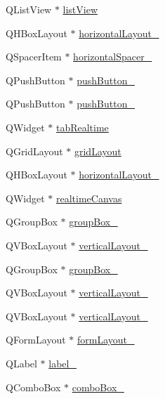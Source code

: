 \begin{DoxyCompactItemize}
\item 
Q\+List\+View $\ast$ \hyperlink{class_ui___client_view_ab642793b2516ba6e58ebbe2d7fe42fa5}{list\+View}
\item 
Q\+H\+Box\+Layout $\ast$ \hyperlink{class_ui___client_view_aed82dc8f9f66b2148ec2d902cb69feb1}{horizontal\+Layout\+\_}
\item 
Q\+Spacer\+Item $\ast$ \hyperlink{class_ui___client_view_acb80a03d3795c11de4c7da9cdcbc0872}{horizontal\+Spacer\+\_}
\item 
Q\+Push\+Button $\ast$ \hyperlink{class_ui___client_view_a343d0ec185fc44de1d6da83f943cb90f}{push\+Button\+\_}
\item 
Q\+Push\+Button $\ast$ \hyperlink{class_ui___client_view_af081e4b32fc67ba9c0244bea3c47fc00}{push\+Button\+\_}
\item 
Q\+Widget $\ast$ \hyperlink{class_ui___client_view_ab7a905c8d7da66d465f7801c6724a591}{tab\+Realtime}
\item 
Q\+Grid\+Layout $\ast$ \hyperlink{class_ui___client_view_ab9f0b12942ece16be12503604c116b74}{grid\+Layout}
\item 
Q\+H\+Box\+Layout $\ast$ \hyperlink{class_ui___client_view_a86c70e5ff3d118a228d6010bfaa302d6}{horizontal\+Layout\+\_}
\item 
Q\+Widget $\ast$ \hyperlink{class_ui___client_view_a37773ebe17a2e74feea99cb4c45be113}{realtime\+Canvas}
\item 
Q\+Group\+Box $\ast$ \hyperlink{class_ui___client_view_a216081f1bbb11729d0ecff74ecb3e705}{group\+Box\+\_}
\item 
Q\+V\+Box\+Layout $\ast$ \hyperlink{class_ui___client_view_ad1037c40aae069d817bda2d6b37e7cd8}{vertical\+Layout\+\_}
\item 
Q\+Group\+Box $\ast$ \hyperlink{class_ui___client_view_a62a75df620b063d5bd67f65a201f5657}{group\+Box\+\_}
\item 
Q\+V\+Box\+Layout $\ast$ \hyperlink{class_ui___client_view_a65f193067cb20dcfde40c2fa94d50bc9}{vertical\+Layout\+\_}
\item 
Q\+V\+Box\+Layout $\ast$ \hyperlink{class_ui___client_view_ad5ce2749c87f255604291402d313c2e2}{vertical\+Layout\+\_}
\item 
Q\+Form\+Layout $\ast$ \hyperlink{class_ui___client_view_af2f66295a6521df9db16aa0412f6836d}{form\+Layout\+\_}
\item 
Q\+Label $\ast$ \hyperlink{class_ui___client_view_a40d9710e0ace8c11b19a948f02fe8b53}{label\+\_}
\item 
Q\+Combo\+Box $\ast$ \hyperlink{class_ui___client_view_a08415ac99e112d1847e4297c5d6ff318}{combo\+Box\+\_}

\end{DoxyCompactItemize}
